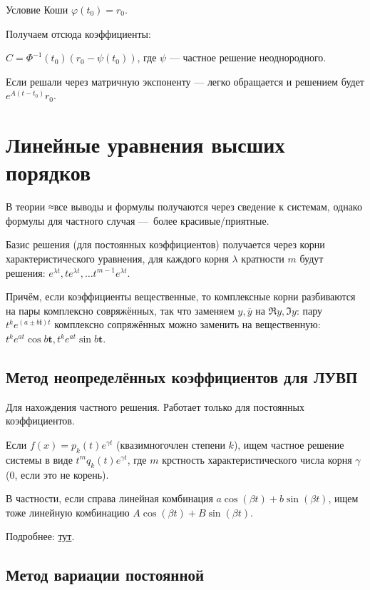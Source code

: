 \documentclass[12pt, a4paper]{article}
\begin{document}
Условие Коши $\varphi(t_0) = r_0$.

Получаем отсюда коэффициенты:

$C = \Phi^{-1}(t_0) (r_0 - \psi(t_0))$, где $\psi$ — частное решение неоднородного.

Если решали через матричную экспоненту — легко обращается и решением будет $e^{A(t - t_0)}r_0$.

\section{Линейные уравнения высших порядков}

В теории ≈все выводы и формулы получаются через сведение к системам, 
однако формулы для частного случая — более красивые/приятные.


Базис решения (для постоянных коэффициентов) получается через корни характеристического уравнения, 
для каждого корня $\lambda$ кратности $m$ будут решения: $e^{\lambda t}, te^{\lambda t}, … t^{m - 1} e^{\lambda t}$.

Причём, если коэффициенты вещественные, то комплексные корни разбиваются на пары комплексно совряжённых, 
так что заменяем $y, \overline{y}$ на $\Re y, \Im y$: пару $t^k e^{(a ± b\mathbf{i})t}$ комплексно сопряжённых можно заменить на вещественную:
$t^k e^{at} \cos b\mathbf{t}, t^k e^{at} \sin b\mathbf{t}$.


\subsection{Метод неопределённых коэффициентов для ЛУВП}

Для нахождения частного решения. Работает только для постоянных коэффициентов.

Если $f(x) = p_k(t) e^{\gamma t}$ (квазимногочлен степени $k$),
ищем частное решение системы в виде $t^m q_k(t) e^{\gamma t}$, где $m$ крстность характеристического числа корня $\gamma$ ($0$, если это не корень).

В частности, если справа линейная комбинация $a \cos(βt)+b \sin(βt)$, ищем тоже линейную комбинацию $A \cos(βt)+ B \sin(βt)$.

Подробнее: \href{https://tutorial.math.lamar.edu/Classes/DE/UndeterminedCoefficients.aspx}{тут}.

\subsection{Метод вариации постоянной}
\end{document}
